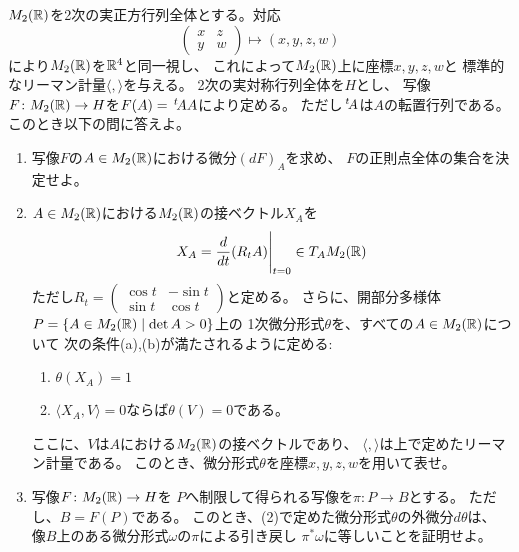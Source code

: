 \documentclass[report]{jlreq}
\begin{document}
\begin{problem}[第8問]
    $M_2(\mathbb{R})$を2次の実正方行列全体とする。対応
    \[
        \begin{pmatrix}
            x & z \\
            y & w
        \end{pmatrix}
            \mapsto
            (x, y, z, w)
    \]
    により$M_2(\mathbb{R})$を$\mathbb{R}^4$と同一視し、
    これによって$M_2(\mathbb{R})$上に座標$x, y, z, w$と
    標準的なリーマン計量$\langle,\rangle$を与える。
    2次の実対称行列全体を$H$とし、
    写像$F\colon M_2(\mathbb{R}) \to H$を$F(A) = \,{}^{t}\!A A$により定める。
    ただし$\,{}^{t}\!A$は$A$の転置行列である。
    このとき以下の問に答えよ。
    \begin{enumerate}
        \item 写像$F$の$A \in M_2(\mathbb{R})$における微分$(dF)_A$を求め、
            $F$の正則点全体の集合を決定せよ。
        \item $A \in M_2(\mathbb{R})$における$M_2(\mathbb{R})$の接ベクトル$X_A$を
            \[
                X_A = \frac{d}{dt}(R_t A) \Bigg|_{t=0} \in T_AM_2(\mathbb{R})
            \]
            ただし$R_t = \begin{pmatrix}
                \cos t & -\sin t \\
                \sin t & \cos t
            \end{pmatrix}$と定める。
            さらに、開部分多様体$P = \{A \in M_2(\mathbb{R}) \mid \det A > 0 \}$上の
            1次微分形式$\theta$を、すべての$A \in M_2(\mathbb{R})$について
            次の条件(a),(b)が満たされるように定める:
            \begin{enumerate}[label=(\alph*)]
                \item $\theta(X_A) = 1$
                \item $\langle X_A, V \rangle = 0$ならば$\theta(V) = 0$である。
            \end{enumerate}
            ここに、$V$は$A$における$M_2(\mathbb{R})$の接ベクトルであり、
            $\langle,\rangle$は上で定めたリーマン計量である。
            このとき、微分形式$\theta$を座標$x,y,z,w$を用いて表せ。
        \item 写像$F \colon M_{2}(\mathbb{R}) \to H$を
            $P$へ制限して得られる写像を$\pi \colon P \to B$とする。
            ただし、$B = F(P)$である。
            このとき、(2)で定めた微分形式$\theta$の外微分$d\theta$は、
            像$B$上のある微分形式$\omega$の$\pi$による引き戻し
            $\pi^*\omega$に等しいことを証明せよ。
    \end{enumerate}
\end{problem}
\end{document}
